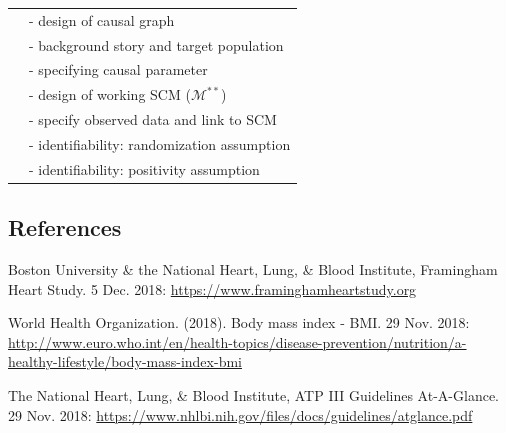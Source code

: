 \documentclass[]{article}
\begin{document}
\begin{table}[h!]
\begin{tabular}{|l|l|}
      & - design of causal graph \\
      & - background story and target population \\
      & - specifying causal parameter \\
      & - design of working SCM ($\mathcal{M}^{**}$) \\
      & - specify observed data and link to SCM \\
      & - identifiability: randomization assumption \\
      & - identifiability: positivity assumption \\ \hline
  \end{tabular}
\end{table}

\subsection{References}\label{references}

Boston University \& the National Heart, Lung, \& Blood Institute,
Framingham Heart Study. 5 Dec. 2018:
\url{https://www.framinghamheartstudy.org}

World Health Organization. (2018). Body mass index - BMI. 29 Nov. 2018:
\url{http://www.euro.who.int/en/health-topics/disease-prevention/nutrition/a-healthy-lifestyle/body-mass-index-bmi}

The National Heart, Lung, \& Blood Institute, ATP III Guidelines
At-A-Glance. 29 Nov. 2018:
\url{https://www.nhlbi.nih.gov/files/docs/guidelines/atglance.pdf}
\end{document}

